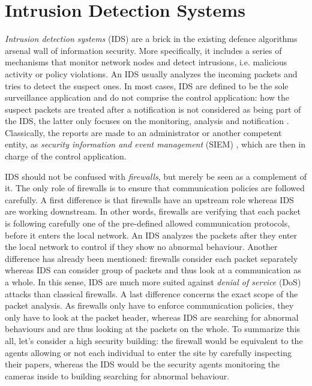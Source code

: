 \section{Intrusion Detection Systems}
\emph{Intrusion detection systems} (IDS) are a brick in the existing defence algorithms arsenal wall of information security. More specifically, it includes a series of mechanisms that monitor network nodes and detect intrusions, i.e. malicious activity or policy violations. An IDS usually analyzes the incoming packets and tries to detect the suspect ones. In most cases, IDS are defined to be the sole surveillance application and do not comprise the control application: how the suspect packets are treated after a notification is not considered as being part of the IDS, the latter only focuses on the monitoring, analysis and notification \cite{Mukherjee1994NetworkDetection}. Classically, the reports are made to an administrator or another competent entity, as \emph{security information and event management} (SIEM) \cite{Bhatt2014TheSystems}, which are then in charge of the control application. 

IDS should not be confused with \emph{firewalls}, but merely be seen as a complement of it. The only role of firewalls is to ensure that communication policies are followed carefully. A first difference is that firewalls have an upstream role whereas IDS are working downstream. In other words, firewalls are verifying that each packet is following carefully one of the pre-defined allowed communication protocols, before it enters the local network. An IDS analyzes the packets after they enter the local network to control if they show no abnormal behaviour. Another difference has already been mentioned: firewalls consider each packet separately whereas IDS can consider group of packets and thus look at a communication as a whole. In this sense, IDS are much more suited against \emph{denial of service} (DoS) attacks than classical firewalls. A last difference concerns the exact scope of the packet analysis. As firewalls only have to enforce communication policies, they only have to look at the packet header, whereas IDS are searching for abnormal behaviours and are thus looking at the packets on the whole. To summarize this all, let's consider a high security building: the firewall would be equivalent to the agents allowing or not each individual to enter the site by carefully inspecting their papers, whereas the IDS would be the security agents monitoring the cameras inside to building searching for abnormal behaviour.

